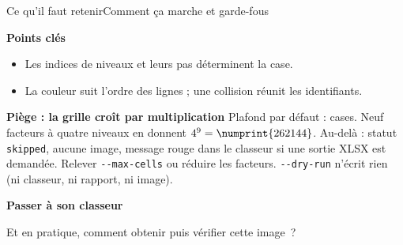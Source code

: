\begin{frame}[t]{Ce qu'il faut retenir}{Comment ça marche et garde-fous}
\vfill
{
\begin{mybox3}{\textbf{Points clés}}
\begin{itemize}\itemsep4pt
\item Les indices de niveaux et leurs pas déterminent la case.
\item La couleur suit l'ordre des lignes ; une collision réunit les identifiants.
\end{itemize}
\end{mybox3}
\begin{mybox3}{\textbf{Piège : la grille croît par multiplication}}
Plafond par défaut :  cases. Neuf facteurs à quatre niveaux en donnent $4^9=\numprint{262144}$. Au-delà : statut \texttt{skipped}, aucune image, message rouge dans le classeur si une sortie XLSX est demandée. Relever \texttt{-{}-max-cells} ou réduire les facteurs. \texttt{-{}-dry-run} n'écrit rien (ni classeur, ni rapport, ni image).
\end{mybox3}}
\vfill
\end{frame}

\begin{frame}[plain]
\centering\vspace{1cm}
\textbf{\Huge Passer à son classeur}
\vspace{1cm}

{\large Et en pratique, comment obtenir puis vérifier cette image~?}
\end{frame}

